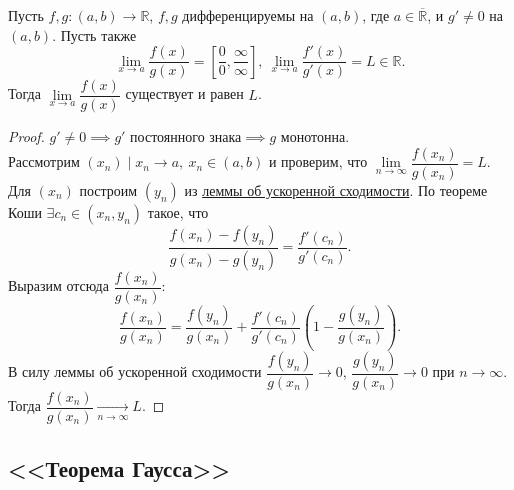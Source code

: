 \begin{theorem} \hypertarget{t3}{}
	Пусть $f, g \colon (a, b) \to \mathbb{R}$, $f, g$ дифференцируемы на $(a, b)$, где $a \in \overline{\mathbb{R}}$, и $g' \neq 0$ на $(a, b)$.
	Пусть также \[
	\lim_{x \to a} \frac{f(x)}{g(x)} = \left[ \frac00, \frac{\infty}{\infty} \right],
	~\lim_{x \to a} \frac{f'(x)}{g'(x)} = L \in \mathbb{R}.
	\]
	Тогда $\lim\limits_{x \to a} \dfrac{f(x)}{g(x)}$ существует и равен $L$.
\end{theorem}
\begin{proof}
	$g' \neq 0 \implies g' \text{ постоянного знака} \implies g \text{ монотонна}$. \\
	Рассмотрим $(x_n) \mid x_n \to a, ~x_n \in (a, b)$ и проверим, что $\lim\limits_{n \to \infty} \dfrac{f(x_n)}{g(x_n)} = L$.
	Для $(x_n)$ построим $(y_n)$ из \hyperlink{t2}{леммы об ускоренной сходимости}. По теореме Коши
	$\exists c_n \in (x_n, y_n)$ такое, что \[
	\frac{f(x_n) - f(y_n)}{g(x_n) - g(y_n)} = \frac{f'(c_n)}{g'(c_n)}.
	\]
	Выразим отсюда $\dfrac{f(x_n)}{g(x_n)}$: \[
	\frac{f(x_n)}{g(x_n)} = \frac{f(y_n)}{g(x_n)} + \frac{f'(c_n)}{g'(c_n)} \left(1 - \frac{g(y_n)}{g(x_n)} \right).
	\]
	В силу леммы об ускоренной сходимости $\dfrac{f(y_n)}{g(x_n)} \to 0$, $\dfrac{g(y_n)}{g(x_n)} \to 0$ при \(n \to \infty\). Тогда $\dfrac{f(x_n)}{g(x_n)} \xrightarrow[n \to \infty]{} L$.
\end{proof}

\subsection{<<Теорема Гаусса>>}


